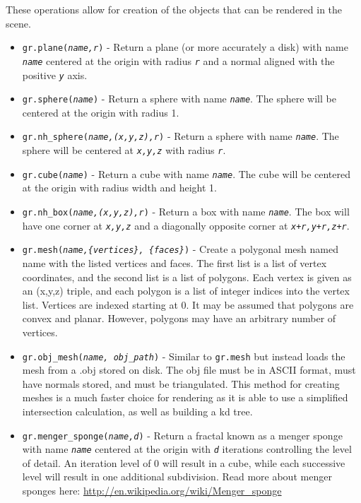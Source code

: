 \documentclass[12pt]{article}
\begin{document}
These operations allow for creation of the objects that can be rendered in the scene. 
\begin{itemize} \itemsep1pt \parskip0pt 
\item{\texttt{gr.plane(\textit{name,r})} - Return a plane (or more accurately a disk) with name \textit{\texttt{name}} centered at the origin with radius \texttt{\textit{r}} and a normal aligned with the positive \texttt{\textit{y}} axis.}
\item{\texttt{gr.sphere(\textit{name})} - Return a sphere with name \textit{\texttt{name}}. The sphere will be centered at the origin with radius 1.}
\item{\texttt{gr.nh\_sphere(\textit{name,(x,y,z),r})} - Return a sphere with name \textit{\texttt{name}}. The sphere will be centered at \texttt{\textit{x,y,z}} with radius \texttt{\textit{r}}.}
\item{\texttt{gr.cube(\textit{name})} - Return a cube with name \textit{\texttt{name}}. The cube will be centered at the origin with radius width and height 1.}
\item{\texttt{gr.nh\_box(\textit{name,(x,y,z),r})} - Return a box with name \textit{\texttt{name}}. The box will have one corner at \texttt{\textit{x,y,z}} and a diagonally opposite corner at \texttt{\textit{x+r,y+r,z+r}}.}
\item{\texttt{gr.mesh(\textit{name,\{vertices\}, \{faces\}})} - Create a polygonal mesh named name with the listed vertices and faces. The first list is a list of vertex coordinates, and the second list is a list of polygons. Each vertex is given as an (x,y,z) triple, and each polygon is a list of integer indices into the vertex list. Vertices are indexed starting at 0.
It may be assumed that polygons are convex and planar. However, polygons may have an arbitrary number of vertices.}
\item{\texttt{gr.obj\_mesh(\textit{name, obj\_path})} - Similar to \texttt{gr.mesh} but instead loads the mesh from a .obj stored on disk. The obj file must be in ASCII format, must have normals stored, and must be triangulated. This method for creating meshes is a much faster choice for rendering as it is able to use a simplified intersection calculation, as well as building a kd tree.}
\item{\texttt{gr.menger\_sponge(\textit{name,d})} - Return a fractal known as a menger sponge with name \textit{\texttt{name}} centered at the origin with \texttt{\textit{d}} iterations controlling the level of detail. An iteration level of 0 will result in a cube, while each successive level will result in one additional subdivision. Read more about menger sponges here: \url{http://en.wikipedia.org/wiki/Menger_sponge} }

\end{itemize}
\end{document}
